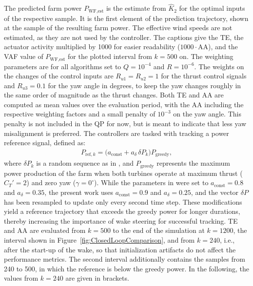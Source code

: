 The predicted farm power $P_{\text{WF,est}}$ is the estimate from $\hat{K}_2$ for the optimal inputs of the respective sample. It is the first element of the prediction trajectory, shown at the sample of the resulting farm power. The effective wind speeds are not estimated, as they are not used by the controller. The captions give the TE, the actuator activity multiplied by 1000 for easier readability ($1000\cdot$AA), and the VAF value of $P_{\text{WF,est}}$ for the plotted interval from $k = 500$ on. The weighting parameters are for all algorithms set to $Q = 10^{-4}$ and $R = 10^{-6}$. The weights on the changes of the control inputs are $R_{u1} = R_{u2} = 1$ for the thrust control signals and $R_{u3} = 0.1$ for the yaw angle in degrees, to keep the yaw changes roughly in the same order of magnitude as the thrust changes. Both TE and AA are computed as mean values over the evaluation period, with the AA including the respective weighting factors and a small penalty of $10^{-3}$ on the yaw angle. This penalty is not included in the QP for now, but is meant to indicate that less yaw misalignment is preferred.
%
The controllers are tasked with tracking a power reference signal, defined as:
\begin{align*}
    P_{\text{ref},k} = \big(a_{\text{const}} + a_{\delta} \, \delta P_k \big) P_{\text{greedy}},
\end{align*}
where $\delta P_k$ is a random sequence as in \cite{sharan2022Koopman}, and $P_{\text{greedy}}$ represents the maximum power production of the farm when both turbines operate at maximum thrust ($C_T' = 2$) and zero yaw ($\gamma = 0^\circ$). While the parameters in \cite{sharan2022Koopman} were set to $a_{\text{const}} = 0.8$ and $a_{\delta} = 0.35$, the present work uses $a_{\text{const}} = 0.9$ and $a_{\delta} = 0.25$, and the vector $\delta P$ has been resampled to update only every second time step. These modifications yield a reference trajectory that exceeds the greedy power for longer durations, thereby increasing the importance of wake steering for successful tracking. TE and AA are evaluated from $k = 500$ to the end of the simulation at $k = 1200$, the interval shown in Figure~\ref{fig:ClosedLoopComparison}, and from $k = 240$, i.e., after the start-up of the wake, so that initialization artifacts do not affect the performance metrics. The second interval additionally contains the samples from 240 to 500, in which the reference is below the greedy power. In the following, the values from $k = 240$ are given in brackets.

